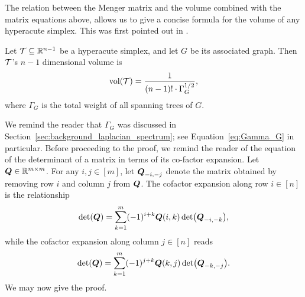The relation between the Menger matrix and the volume combined with the matrix equations above, allows us to give a concise formula for the volume of any hyperacute simplex. This was first pointed out in \cite{van2017pseudoinverse}. 

\begin{lemma}
	\label{lem:volume}
	Let $\mathcal{T}\subseteq\mathbb{R}^{n-1}$ be a hyperacute simplex, and let $G$ be its associated graph. Then $\mathcal{T}$'s $n-1$ dimensional volume is 
	\begin{equation}
	\label{eq:vol(T)}
	\textnormal{vol}(\mathcal{T}) = \frac{1}{(n-1)!\cdot \Gamma_G^{1/2}},
	\end{equation}
	where $\Gamma_G$ is the total weight of all spanning  trees of $G$. 
\end{lemma}
We remind the reader that $\Gamma_G$ was discussed in  Section~\ref{sec:background_laplacian_spectrum}; see  Equation~\ref{eq:Gamma_G}  in particular. 
Before proceeding to the proof, we remind the reader of the equation of the determinant of a matrix in terms of its co-factor expansion. Let $\vb*{Q}\in\mathbb{R}^{m\times m}$. For any $i,j\in[m]$, let $\vb*{Q}_{-i,-j}$ denote the matrix obtained by removing row $i$ and column $j$ from $\vb*{Q}$. The cofactor expansion along row $i\in[n]$ is the relationship
\begin{equation*}
\det(\vb*{Q}) = \sum_{k=1}^m (-1)^{i+k} \vb*{Q}(i,k)\det(\vb*{Q}_{-i,-k}),
\end{equation*}
while the cofactor expansion along column $j\in[n]$ reads
\begin{equation*}
\det(\vb*{Q}) = \sum_{k=1}^m (-1)^{j+k} \vb*{Q}(k,j)\det(\vb*{Q}_{-k,-j}). 
\end{equation*}
We may now give the proof. 
